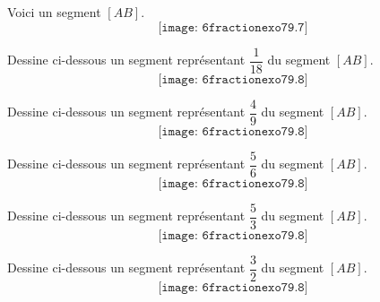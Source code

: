 Voici un segment $[AB]$.
  \[\texttt{[image: 6fractionexo79.7]}\]
  \begin{myenumerate}
    \item Dessine ci-dessous un segment représentant $\dfrac1{18}$ du
      segment $[AB]$.
      \[\texttt{[image: 6fractionexo79.8]}\]
    \item Dessine ci-dessous un segment représentant $\dfrac49$ du
      segment $[AB]$.
      \[\texttt{[image: 6fractionexo79.8]}\]
    \item Dessine ci-dessous un segment représentant $\dfrac56$ du
      segment $[AB]$.
      \[\texttt{[image: 6fractionexo79.8]}\]
    \item Dessine ci-dessous un segment représentant $\dfrac53$ du
      segment $[AB]$.
      \[\texttt{[image: 6fractionexo79.8]}\]
    \item Dessine ci-dessous un segment représentant $\dfrac32$ du
      segment $[AB]$.
      \[\texttt{[image: 6fractionexo79.8]}\]
  \end{myenumerate}
